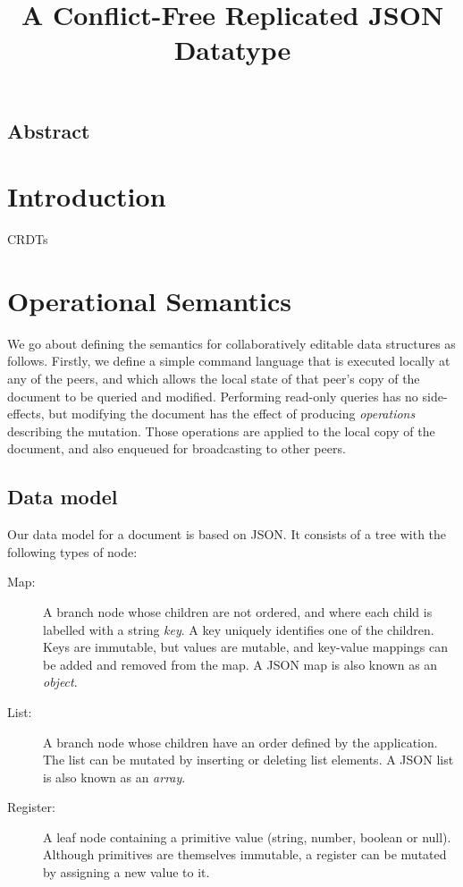 \documentclass[a4paper,twocolumn,10pt]{article}
\begin{document}
\sloppy
\title{A Conflict-Free Replicated JSON Datatype}
\author{}
\maketitle

\subsection*{Abstract}

\section{Introduction}

CRDTs~\cite{Shapiro:2011wy,Roh:2011dw}

%

\section{Operational Semantics}

We go about defining the semantics for collaboratively editable data structures as follows. Firstly, we define a simple command language that is executed locally at any of the peers, and which allows the local state of that peer's copy of the document to be queried and modified. Performing read-only queries has no side-effects, but modifying the document has the effect of producing \emph{operations} describing the mutation. Those operations are applied to the local copy of the document, and also enqueued for broadcasting to other peers.

\subsection{Data model}

Our data model for a document is based on JSON. It consists of a tree with the following types of node:

\begin{description}
\item[Map:] A branch node whose children are not ordered, and where each child is labelled with a string \emph{key}. A key uniquely identifies one of the children. Keys are immutable, but values are mutable, and key-value mappings can be added and removed from the map. A JSON map is also known as an \emph{object}.
\item[List:] A branch node whose children have an order defined by the application. The list can be mutated by inserting or deleting list elements. A JSON list is also known as an \emph{array}.
\item[Register:] A leaf node containing a primitive value (string, number, boolean or null). Although primitives are themselves immutable, a register can be mutated by assigning a new value to it.
\end{description}
\end{document}
